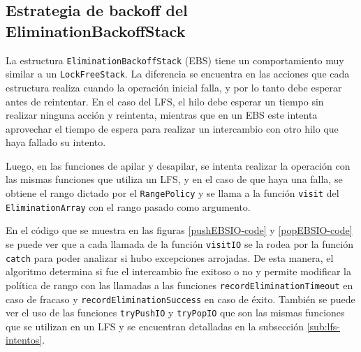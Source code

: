 \clearpage
\subsection{Estrategia de backoff del EliminationBackoffStack}
La estructura \texttt{EliminationBackoffStack} (EBS) tiene un comportamiento muy similar a un \texttt{LockFreeStack}. La diferencia se encuentra en las acciones que cada estructura realiza cuando la operación inicial falla, y por lo tanto debe esperar antes de reintentar. En el caso del LFS, el hilo debe esperar un tiempo sin realizar ninguna acción y reintenta, mientras que en un EBS este intenta aprovechar el tiempo de espera para realizar un intercambio con otro hilo que haya fallado su intento.

Luego, en las funciones de apilar y desapilar, se intenta realizar la operación con las mismas funciones que utiliza un LFS, y en el caso de que haya una falla, se obtiene el rango dictado por el \texttt{RangePolicy} y se llama a la función \texttt{visit} del \texttt{EliminationArray} con el rango pasado como argumento.

En el código que se muestra en las figuras \ref{pushEBSIO-code} y \ref{popEBSIO-code} se puede ver que a cada llamada de la función \texttt{visitIO} se la rodea por la función \texttt{catch} para poder analizar si hubo excepciones arrojadas. De esta manera, el algoritmo determina si fue el intercambio fue exitoso o no y permite modificar la política de rango con las llamadas a las funciones \texttt{recordEliminationTimeout} en caso de fracaso y \texttt{recordEliminationSuccess} en caso de éxito. También se puede ver el uso de las funciones \texttt{tryPushIO} y \texttt{tryPopIO} que son las mismas funciones que se utilizan en un LFS y se encuentran detalladas en la subsección \ref{sub:lfs-intentos}.

